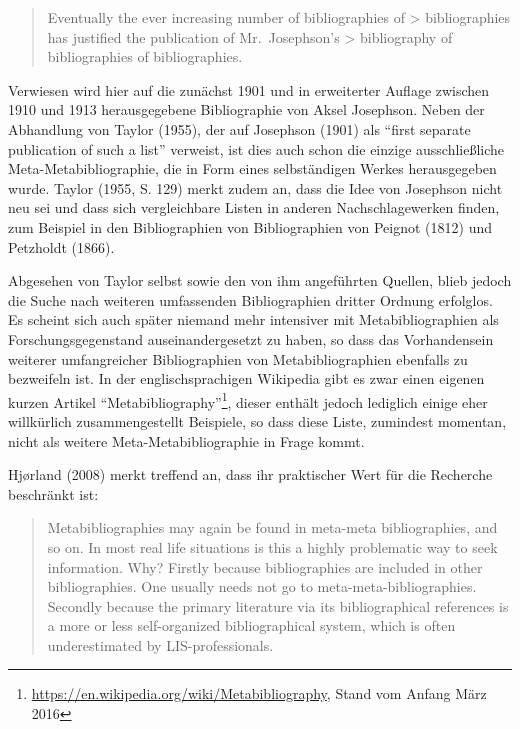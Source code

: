 \documentclass[a4paper,
fontsize=11pt,
oneside,
numbers=noperiodatend,
parskip=half-,
bibliography=totoc,
final
]{scrartcl}
\begin{document}
\begin{quote}
Eventually the ever increasing number of bibliographies of
\textgreater{} bibliographies has justified the publication of
Mr.~Josephson's \textgreater{} bibliography of bibliographies of
bibliographies.
\end{quote}

Verwiesen wird hier auf die zunächst 1901 und in erweiterter Auflage
zwischen 1910 und 1913 herausgegebene Bibliographie von Aksel Josephson.
Neben der Abhandlung von Taylor (1955), der auf Josephson (1901) als
\enquote{first separate publication of such a list} verweist, ist dies
auch schon die einzige ausschließliche Meta-Metabibliographie, die in
Form eines selbständigen Werkes herausgegeben wurde. Taylor (1955, S.
129) merkt zudem an, dass die Idee von Josephson nicht neu sei und dass
sich vergleichbare Listen in anderen Nachschlagewerken finden, zum
Beispiel in den Bibliographien von Bibliographien von Peignot (1812) und
Petzholdt (1866).

Abgesehen von Taylor selbst sowie den von ihm angeführten Quellen, blieb
jedoch die Suche nach weiteren umfassenden Bibliographien dritter
Ordnung erfolglos. Es scheint sich auch später niemand mehr intensiver
mit Metabibliographien als Forschungsgegenstand auseinandergesetzt zu
haben, so dass das Vorhandensein weiterer umfangreicher Bibliographien
von Metabibliographien ebenfalls zu bezweifeln ist. In der
englischsprachigen Wikipedia gibt es zwar einen eigenen kurzen Artikel
\enquote{Metabibliography}\footnote{\url{https://en.wikipedia.org/wiki/Metabibliography},
  Stand vom Anfang März 2016}, dieser enthält jedoch lediglich einige
eher willkürlich zusammengestellt Beispiele, so dass diese Liste,
zumindest momentan, nicht als weitere Meta-Metabibliographie in Frage
kommt.

Hjørland (2008) merkt treffend an, dass ihr praktischer Wert für die
Recherche beschränkt ist:

\begin{quote}
Metabibliographies may again be found in meta-meta bibliographies, and
so on. In most real life situations is this a highly problematic way to
seek information. Why? Firstly because bibliographies are included in
other bibliographies. One usually needs not go to
meta-meta-bibliographies. Secondly because the primary literature via
its bibliographical references is a more or less self-organized
bibliographical system, which is often underestimated by
LIS-professionals.
\end{quote}
\end{document}
